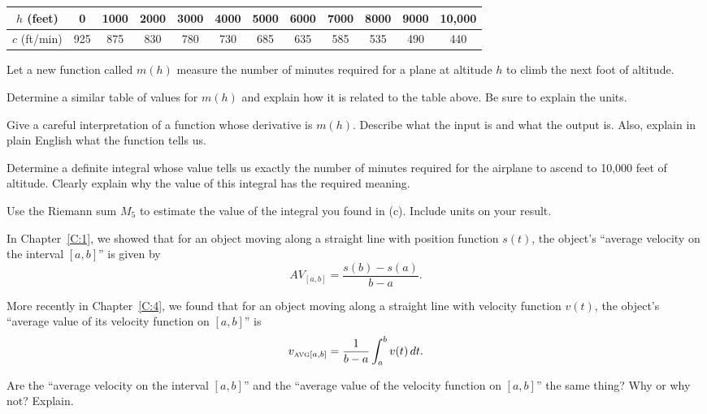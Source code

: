 \begin{exercises}
\begin{center}
  \begin{tabular}{|c||c|c|c|c|c|c|c|c|c|c|c|}
    \hline
    $h$ (feet)&0&1000&2000&3000&4000&5000&6000&7000&8000&9000&10,000\\
    \hline
    $c$ (ft/min)&925&875&830&780&730&685&635&585&535&490&440\\
    \hline
  \end{tabular}
\end{center}

 Let a new function called $m(h)$ measure
the number of minutes required for a plane at altitude $h$ to climb the
next foot of altitude.
\ba
	\item Determine a similar table of values for $m(h)$ and explain how it is related to the table above.  Be sure to explain the units.

	\item Give a careful interpretation of a function whose derivative
is $m(h)$.  Describe what the input is and what the output is.  Also,
explain in plain English what the function tells us.

	\item Determine a definite integral whose value tells us exactly the number of minutes required for the airplane to ascend to
10,000 feet of altitude.  Clearly explain why the value of this integral has the required meaning.

	\item Use the Riemann sum $M_5$ to estimate the value of the integral you found in (c).  Include units on your result.
\ea

  \item In Chapter~\ref{C:1}, we showed that for an object moving along a straight line with position function $s(t)$, the object's ``average velocity on the interval $[a,b]$'' is given by 
  $$\displaystyle AV_{[a,b]} =  \frac{s(b)-s(a)}{b-a}.$$
	
	More recently in Chapter~\ref{C:4}, we found that for an object moving along a straight line  with velocity function $v(t)$, the object's ``average value of its velocity function on $[a,b]$'' is 
	$$\displaystyle v_{\mbox{\tiny{AVG}}[a,b]}  = \frac{1}{b-a} \int_a^b v(t) \, dt.$$
	
Are the ``average velocity on the interval $[a,b]$'' and the ``average value of the velocity function on $[a,b]$'' the same thing?  Why or why not?  Explain.

\end{exercises}
\afterexercises

